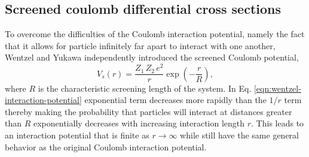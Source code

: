 \subsection{Screened coulomb differential cross sections}
To overcome the difficulties of the Coulomb interaction potential, namely the fact that it allows for particle infinitely far apart to interact with one another, Wentzel and Yukawa independently introduced the screened Coulomb potential,
\begin{equation} \label{eqn:wentzel-interaction-potential}
    V_s(r) = \dfrac{Z_1 \, Z_2 \, e^2}{r} \exp \left(-\frac{r}{R}\right),
\end{equation}
where $R$ is the characteristic screening length of the system. In Eq. \eqref{eqn:wentzel-interaction-potential} exponential term decreases more rapidly than the $1/r$ term thereby making the probability that particles will interact at distances greater than $R$ exponentially decreases with increasing interaction length $r$. This leads to an interaction potential that is finite as $r \rightarrow \infty$ while still have the same general behavior as the original Coulomb interaction potential.

